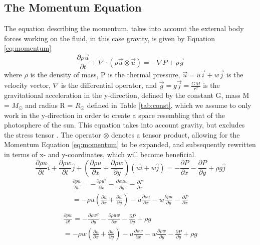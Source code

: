 \documentclass[10pt, nofootinbib, twocolumn]{revtex4-1}
\begin{document}
\subsection{The Momentum Equation}
The equation describing the momentum, takes into account the external body forces working on the fluid, in this case gravity, is given by Equation \eqref{eq:momentum} \cite{text}
\begin{equation}\label{eq:momentum}
    \frac{\partial \rho \vec{u}}{\partial t}+\nabla \cdot (\rho \vec{u}\otimes\vec{u})=-\nabla P +\rho \vec{g}
\end{equation}
where $\rho$ is the density of mass, P is the thermal pressure, $\vec{u}=u\vec{i}+w\vec{j}$ is the velocity vector, $\nabla$ is the differential operator, and $\vec{g}=g\vec{j}=\frac{GM}{r^2}$ is the gravitational acceleration in the y-direction, defined by the constant G, mass M = $M_\odot$ and radius R = $R_\odot$ defined in Table \ref{tab:const}, which we assume to only work in the y-direction in order to create a space resembling that of the photosphere of the sun. This equation takes into account gravity, but excludes the stress tensor \cite{ast}. The operator $\otimes$ denotes a tensor product, allowing for the Momentum Equation \eqref{eq:momentum} to be expanded, and subsequently rewritten in terms of x- and y-coordinates, which will become beneficial.
\begin{equation}
    \frac{\partial \rho u }{\partial t}\hat{i} + \frac{\partial \rho w }{\partial t}\hat{j} +(\frac{\partial \rho u }{\partial x} + \frac{\partial \rho w }{\partial y})(u\hat{i}+w\hat{j}) = - \frac{\partial P}{\partial x} -\frac{\partial P}{\partial y} + \rho g \hat{j}
\end{equation}
\begin{equation}\label{eq:mom_u}
\begin{split}
     \frac{\partial \rho u }{\partial t} = -\frac{\partial \rho u^2}{\partial x}-\frac{\partial \rho uw}{\partial y}-\frac{\partial P}{\partial x} \\
     = -\rho u \left( \frac{\partial u}{\partial x} +\frac{\partial w}{\partial y} \right) -u\frac{\partial \rho u}{\partial x}-w\frac{\partial \rho u}{\partial y}-\frac{\partial P}{\partial x} \\
\end{split}
\end{equation}
\begin{equation}\label{eq:mom_w}
\begin{split}
    \frac{\partial \rho w }{\partial t} = -\frac{\partial \rho w^2}{\partial y}-\frac{\partial \rho uw}{\partial x}-\frac{\partial P}{\partial y}+\rho g \\
    = -\rho w \left( \frac{\partial u}{\partial x} +\frac{\partial w}{\partial y} \right)-u\frac{\partial \rho w}{\partial x}-w\frac{\partial \rho w}{\partial y}-\frac{\partial P}{\partial y}+\rho g 
\end{split}
\end{equation}
\end{document}
